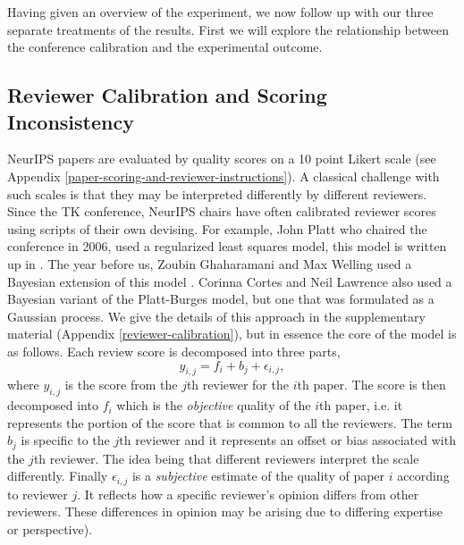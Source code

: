 \documentclass[twoside]{article}
\begin{document}
Having given an overview of the experiment, we now follow up with our
three separate treatments of the results. First we will explore the
relationship between the conference calibration and the experimental
outcome.

\hypertarget{reviewer-calibration-and-scoring-inconsistency}{%
\subsection{Reviewer Calibration and Scoring Inconsistency}\label{reviewer-calibration-and-scoring-inconsistency}}

NeurIPS papers are evaluated by quality scores on a 10 point Likert
scale (see Appendix \ref{paper-scoring-and-reviewer-instructions}). A
classical challenge with such scales is that they may be interpreted
differently by different reviewers. Since the TK conference, NeurIPS
chairs have often calibrated reviewer scores using scripts of their
own devising. For example, John Platt who chaired the conference in
2006, used a regularized least squares model, this model is written up
in \cite{Platt-calibration12}. The year before us, Zoubin Ghaharamani
and Max Welling used a Bayesian extension of this model
\cite{Ge-bayesian15}. Corinna Cortes and Neil Lawrence also used a
Bayesian variant of the Platt-Burges model, but one that was
formulated as a Gaussian process. We give the details of this approach
in the supplementary material (Appendix \ref{reviewer-calibration}),
but in essence the core of the model is as follows. Each review score
is decomposed into three parts,
$$
y_{i,j} = f_i + b_j + \epsilon_{i, j},
$$
where $y_{i,j}$ is the score from the $j$th reviewer for the $i$th
paper. The score is then decomposed into $f_i$ which is the
\emph{objective} quality of the $i$th paper, i.e. it represents the
portion of the score that is common to all the reviewers. The term
$b_j$ is specific to the $j$th reviewer and it represents an offset or
bias associated with the $j$th reviewer. The idea being that different
reviewers interpret the scale differently. Finally $\epsilon_{i,j}$ is
a \emph{subjective} estimate of the quality of paper $i$ according to
reviewer $j$. It reflects how a specific reviewer's opinion differs
from other reviewers. These differences in opinion may be arising due
to differing expertise or perspective).
\end{document}
